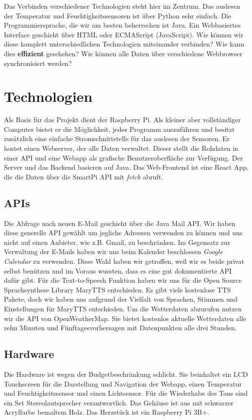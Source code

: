 \documentclass[11pt,a4paper]{article}
\begin{document}
Das Verbinden verschiedener Technologien steht hier im Zentrum. Das auslesen der Temperatur und Feuchtigkeitssensoren ist über Python sehr einfach. Die Programmiersprache, die wir am besten beherrschen ist Java. Ein Webbasiertes Interface geschieht über HTML oder ECMAScript (JavaScript). Wie können wir diese komplett unterschiedlichen Technologien miteinander verbinden? Wie kann dies \textbf{effizient} geschehen? Wie können alle Daten über verschiedene Webbrowser synchronisiert werden?

\section{Technologien}
Als Basis für das Projekt dient der Raspberry Pi. Als kleiner aber vollständiger Computer bietet er die Möglichkeit, jedes Programm auszuführen und besitzt zusätzlich eine einfache Stromschnittstelle für das auslesen der Sensoren. Er hostet einen Webserver, der alle Daten verwaltet. Dieser stellt die Rohdaten in einer API und eine Webapp als grafische Benutzeroberfläche zur Verfügung. Der Server und das Backend basieren auf Java. Das Web-Frontend ist eine React App, die die Daten über die SmartPi API mit \textit{fetch} abruft.

\subsection{APIs}
Die Abfrage nach neuen E-Mail geschieht über die Java Mail API. Wir haben diese generelle API gewählt um jegliche Adressen verwenden zu können und uns nicht auf einen Anbieter, wie z.B. Gmail, zu beschr\"anken. Im Gegensatz zur Verwaltung der E-Mails haben wir uns beim Kalender beschlossen \textit{Google Calendar} zu verwenden. Diese Wahl haben wir getroffen, weil wir es beide privat selbst  ben\"utzen und im Voraus wussten, dass es eine gut dokumentierte API dafür gibt. Für die Text-to-Speech Funktion haben wir uns für die Open Source Sprachsynthese Library MaryTTS entschieden. Es gibt viele kostenlose TTS Pakete, doch wir haben uns aufgrund der Vielfalt von Sprachen, Stimmen und Einstellungen für MaryTTS entschieden. Um die Wetterdaten abzurufen nutzen wir die API von OpenWeatherMap. Sie bietet kostenlos aktuelle Wetterdaten alle zehn Minuten und Fünftagesvorhersagen mit Datenpunkten alle drei Stunden.

\subsection{Hardware}
Die Hardware ist wegen der Budgetbeschränkung schlicht. Sie beinhaltet ein LCD Touchscreen für die Darstellung und Navigation der Webapp, einen Temperatur und Feuchtigkeitssensor und einen Lichtsensor. Für die Wiederhabe des Tons sind ein Set Stereolautsprecher verantwortlich. Das Gehäuse ist aus mit schwarzer Acrylfarbe bemaltem Holz. Das Herzstück ist ein Raspberry Pi 3B+.
\end{document}
